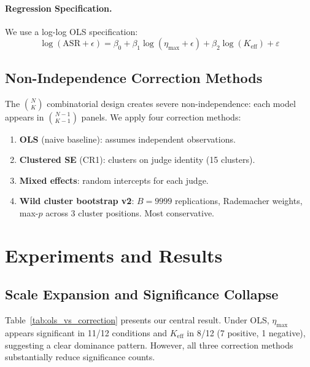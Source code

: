 \documentclass[11pt]{article}
\begin{document}
\paragraph{Regression Specification.} We use a log-log OLS specification:
\begin{equation}
    \log(\text{ASR} + \epsilon) = \beta_0 + \beta_1 \log(\eta_{\max} + \epsilon) + \beta_2 \log(K_{\text{eff}}) + \varepsilon
\end{equation}

\subsection{Non-Independence Correction Methods}

The $\binom{N}{K}$ combinatorial design creates severe non-independence: each model appears in $\binom{N-1}{K-1}$ panels. We apply four correction methods:

\begin{enumerate}[nosep]
    \item \textbf{OLS} (naive baseline): assumes independent observations.
    \item \textbf{Clustered SE} (CR1): clusters on judge identity (15 clusters).
    \item \textbf{Mixed effects}: random intercepts for each judge.
    \item \textbf{Wild cluster bootstrap v2}: $B{=}9999$ replications, Rademacher weights, max-$p$ across 3 cluster positions. Most conservative.
\end{enumerate}


\section{Experiments and Results}

\subsection{Scale Expansion and Significance Collapse}
\label{sec:scale}

Table~\ref{tab:ols_vs_correction} presents our central result. Under OLS, $\eta_{\max}$ appears significant in 11/12 conditions and $K_{\text{eff}}$ in 8/12 (7 positive, 1 negative), suggesting a clear dominance pattern. However, all three correction methods substantially reduce significance counts.
\end{document}
